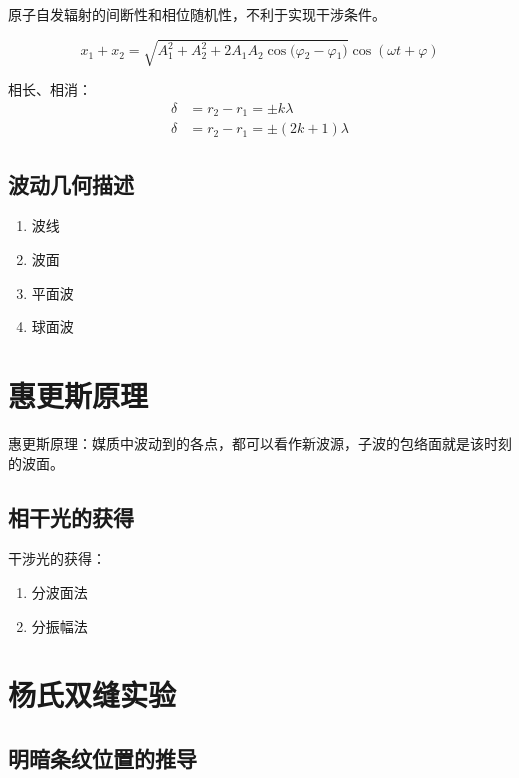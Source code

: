 原子自发辐射的间断性和相位随机性，不利于实现干涉条件。

\begin{equation}
    x_1+x_2=\sqrt{A_1^2+A_2^2+2A_1A_2\cos{(\varphi{}_2-\varphi{}_1})}\cos{(\omega{}t+\varphi{})}
\end{equation}

相长、相消：
\begin{equation}
    \begin{aligned}
        \delta{} & =r_2-r_1=\pm{}k\lambda      \\
        \delta{} & =r_2-r_1=\pm{}(2k+1)\lambda
    \end{aligned}
\end{equation}

\subsection{波动几何描述}

\begin{enumerate}
    \item 波线
    \item 波面
    \item 平面波
    \item 球面波
\end{enumerate}

\section{惠更斯原理}

惠更斯原理：媒质中波动到的各点，都可以看作新波源，子波的包络面就是该时刻的波面。

\subsection{相干光的获得}

干涉光的获得：
\begin{enumerate}
    \item 分波面法
    \item 分振幅法
\end{enumerate}

\section{杨氏双缝实验}

\subsection{明暗条纹位置的推导}


